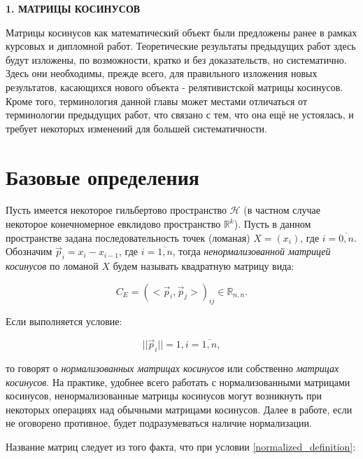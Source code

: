 \newpage
\begin{center}
	\textbf{\large 1. МАТРИЦЫ КОСИНУСОВ}
\end{center}

Матрицы косинусов как математический объект были предложены ранее в рамках курсовых и дипломной работ. Теоретические результаты предыдущих работ здесь будут изложены, по возможности, кратко и без доказательств, но систематично. Здесь они необходимы, прежде всего, для правильного изложения новых результатов, касающихся нового объекта - релятивистской матрицы косинусов. Кроме того, терминология данной главы может местами отличаться от терминологии предыдущих работ, что связано с тем, что она ещё не устоялась, и требует некоторых изменений для большей систематичности.

\section{Базовые определения}

Пусть имеется некоторое гильбертово пространство $\mathcal{H}$ (в частном случае некоторое конечномерное евклидово пространство $\mathbb{R}^{k}$).
Пусть в данном пространстве задана последовательность точек (ломаная) $X = ({x}_{i})$, где $i = \overline{0,n}$. Обозначим $\vec{p}_{i} = {x}_{i} - {x}_{i-1}$, где $i = \overline{1,n}$, тогда \textit{ненормализованной матрицей косинусов} по ломаной $X$ будем называть квадратную матрицу вида:

\begin{equation}
	{C}_{E} = {(<\vec{p}_{i}, \vec{p}_{j}>)}_{ij} \in \mathbb{R}_{n,n}.
	\label{C_E_definition}
\end{equation}

Если выполняется условие:

\begin{equation}
	||\vec{p}_{i}|| = 1, i = \overline{1,n},
	\label{normalized_definition}
\end{equation}

то говорят о \textit{нормализованных матрицах косинусов} или собственно \textit{матрицах косинусов}. На практике, удобнее всего работать с нормализованными матрицами косинусов, ненормализованные матрицы косинусов могут возникнуть при некоторых операциях над обычными матрицами косинусов. Далее в работе, если не оговорено противное, будет подразумеваться наличие нормализации. 

Название матриц следует из того факта, что при условии \ref{normalized_definition}:

